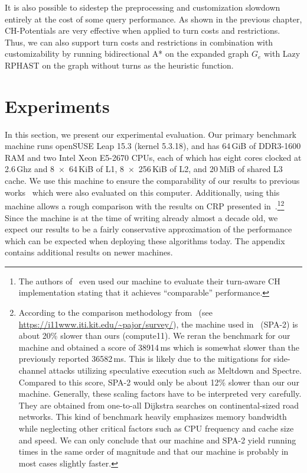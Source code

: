 \documentclass[a4paper, english, cleveref]{lipics-v2021}
\begin{document}
It is also possible to sidestep the preprocessing and customization slowdown entirely at the cost of some query performance.
As shown in the previous chapter, CH-Potentials are very effective when applied to turn costs and restrictions.
Thus, we can also support turn costs and restrictions in combination with customizability by running bidirectional A* on the expanded graph $G_e$ with Lazy RPHAST on the graph without turns as the heuristic function.

\section{Experiments}
\label{sec:experiments}

In this section, we present our experimental evaluation.
Our primary benchmark machine runs openSUSE Leap 15.3 (kernel 5.3.18), and has 64\,GiB of DDR3-1600 RAM and two Intel Xeon E5-2670 CPUs, each of which has eight cores clocked at 2.6\,Ghz and 8~$\times$~64\,KiB of L1, 8~$\times$~256\,KiB of L2, and 20\,MiB of shared L3 cache.
We use this machine to ensure the comparability of our results to previous works~\cite{DibbeltSW16,BuchholdSW19} which were also evaluated on this computer.
Additionally, using this machine allows a rough comparison with the results on CRP presented in~\cite{DellingGPW17}.\footnote{
The authors of~\cite{DellingGPW17} even used our machine to evaluate their turn-aware CH implementation stating that it achieves ``comparable'' performance.
}\footnote{
According to the comparison methodology from~\cite{BastDGMPSWW16} (see \url{https://i11www.iti.kit.edu/~pajor/survey/}), the machine used in~\cite{DellingGPW17} (SPA-2) is about 20\% slower than ours (compute11).
We reran the benchmark for our machine and obtained a score of 38914\,ms which is somewhat slower than the previously reported 36582\,ms.
This is likely due to the mitigations for side-channel attacks utilizing speculative execution such as Meltdown and Spectre.
Compared to this score, SPA-2 would only be about 12\% slower than our our machine.
Generally, these scaling factors have to be interpreted very carefully.
They are obtained from one-to-all Dijkstra searches on continental-sized road networks.
This kind of benchmark heavily emphasizes memory bandwidth while neglecting other critical factors such as CPU frequency and cache size and speed.
We can only conclude that our machine and SPA-2 yield running times in the same order of magnitude and that our machine is probably in most cases slightly faster.
}
Since the machine is at the time of writing already almost a decade old, we expect our results to be a fairly conservative approximation of the performance which can be expected when deploying these algorithms today.
The appendix contains additional results on newer machines.
\end{document}
